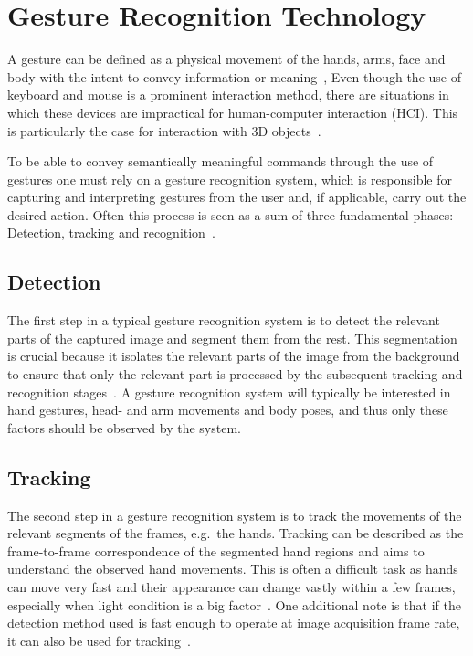 \section{Gesture Recognition Technology}
A gesture can be defined as a physical movement of the hands, arms, face and body with the intent to convey information or meaning~\citep{Mitra2007}, 
Even though the use of keyboard and mouse is a prominent interaction method, there are situations in which
these devices are impractical for human-computer interaction (HCI). This is particularly the case for interaction with 3D objects~\citep{Rautaray2015}. 

To be able to convey semantically meaningful commands through the use of gestures one must rely on a gesture recognition system, 
which is responsible for capturing and interpreting gestures from the user and, if applicable, carry out the desired action. 
Often this process is seen as a sum of three fundamental phases: Detection, tracking and recognition~\citep{Rautaray2015}.

\subsection{Detection}
The first step in a typical gesture recognition system is to detect the relevant parts of the captured image and segment them from the rest. 
This segmentation is crucial because it isolates the relevant parts of the image from the background to ensure that only the relevant part is processed by the subsequent 
tracking and recognition stages~\citep{Cote2006}. 
A gesture recognition system will typically be interested in hand gestures, head- and arm movements and body poses, and thus only these factors should be observed by the system.

\subsection{Tracking}
The second step in a gesture recognition system is to track the movements of the relevant segments of the frames, e.g.~the hands. 
Tracking can be described as the frame-to-frame correspondence of the segmented hand regions and aims to understand the observed hand movements. 
This is often a difficult task as hands can move very fast and their appearance can change vastly within a few frames, 
especially when light condition is a big factor~\citep{Wang2010}. 
One additional note is that if the detection method used is fast enough to operate at image acquisition frame rate, it can also be used for tracking~\citep{Rautaray2015}.   

